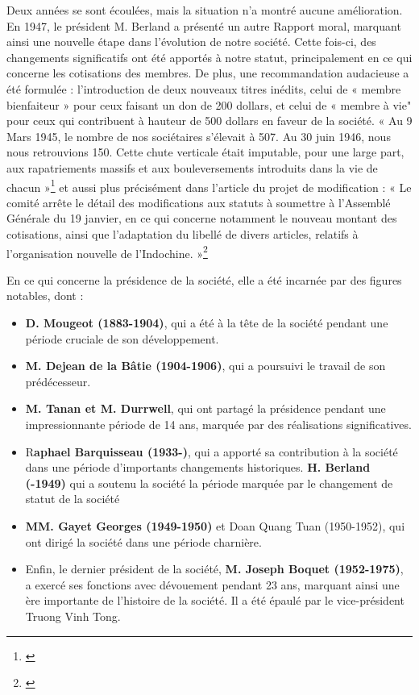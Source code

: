 Deux années se sont écoulées, mais la situation n'a montré aucune amélioration. En 1947, le président M. Berland a présenté un autre Rapport moral, marquant ainsi une nouvelle étape dans l'évolution de notre société. Cette fois-ci, des changements significatifs ont été apportés à notre statut, principalement en ce qui concerne les cotisations des membres. De plus, une recommandation audacieuse a été formulée : l'introduction de deux nouveaux titres inédits, celui de « membre bienfaiteur » pour ceux faisant un don de 200 dollars, et celui de « membre à vie" pour ceux qui contribuent à hauteur de 500 dollars en faveur de la société. 
« Au 9 Mars 1945, le nombre de nos sociétaires s’élevait à 507. Au 30 juin 1946, nous nous retrouvions 150. Cette chute verticale était imputable, pour une large part, aux rapatriements massifs et aux bouleversements introduits dans la vie de chacun »\footnote{\cite{moral}}
et aussi plus précisément dans l'article du projet de modification :
« Le comité arrête le détail des modifications aux statuts à soumettre à l’Assemblé Générale du 19 janvier, en ce qui concerne notamment le nouveau montant des cotisations, ainsi que l’adaptation du libellé de divers articles, relatifs à l’organisation nouvelle de l’Indochine. »\footnote{\cite{change}}


En ce qui concerne la présidence de la société, elle a été incarnée par des figures notables, dont :

\begin{itemize}
    \item \textbf{D. Mougeot (1883-1904)}, qui a été à la tête de la société pendant une période cruciale de son développement.
    \item \textbf{M. Dejean de la Bâtie (1904-1906)}, qui a poursuivi le travail de son prédécesseur.
    \item \textbf{M. Tanan et M. Durrwell}, qui ont partagé la présidence pendant une impressionnante période de 14 ans, marquée par des réalisations significatives.
    \item R\textbf{aphael Barquisseau (1933-)}, qui a apporté sa contribution à la société dans une période d'importants changements historiques.
   \textbf{ H. Berland (-1949)} qui a soutenu la société la période marquée par le changement de statut de la société
    \item \textbf{MM. Gayet Georges (1949-1950)} et Doan Quang Tuan (1950-1952), qui ont dirigé la société dans une période charnière.
    \item Enfin, le dernier président de la société, \textbf{M. Joseph Boquet (1952-1975)}, a exercé ses fonctions avec dévouement pendant 23 ans, marquant ainsi une ère importante de l'histoire de la société. Il a été épaulé par le vice-président Truong Vinh Tong.
\end{itemize}

